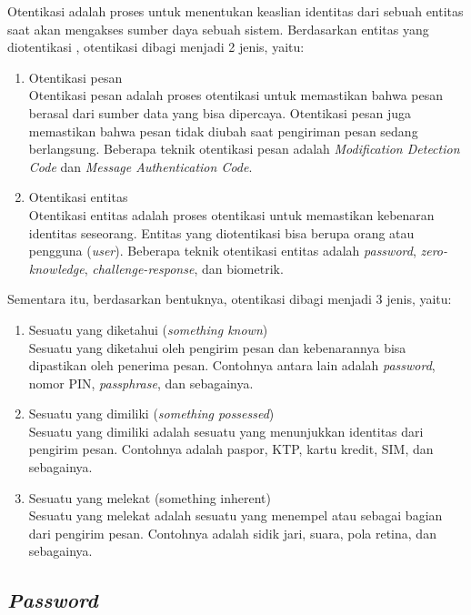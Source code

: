 Otentikasi adalah proses untuk menentukan keaslian identitas dari sebuah entitas saat akan mengakses sumber daya sebuah sistem. Berdasarkan entitas yang diotentikasi \cite{forouzan2007cryptography}, otentikasi dibagi menjadi 2 jenis, yaitu:

\begin{enumerate}
	\item Otentikasi pesan \\
	Otentikasi pesan adalah proses otentikasi untuk memastikan bahwa pesan berasal dari sumber data yang bisa dipercaya. Otentikasi pesan juga memastikan bahwa pesan tidak diubah saat pengiriman pesan sedang berlangsung. Beberapa teknik otentikasi pesan adalah \textit{Modification Detection Code} dan \textit{Message Authentication Code}.
	\item Otentikasi entitas \\
	Otentikasi entitas adalah proses otentikasi untuk memastikan kebenaran identitas seseorang. Entitas yang diotentikasi bisa berupa orang atau pengguna (\textit{user}). Beberapa teknik otentikasi entitas adalah \textit{password}, \textit{zero-knowledge}, \textit{challenge-response}, dan biometrik.
\end{enumerate}

Sementara itu, berdasarkan bentuknya\cite{forouzan2007cryptography}, otentikasi dibagi menjadi 3 jenis, yaitu:
\begin{enumerate}
	\item Sesuatu yang diketahui (\textit{something known}) \\
	Sesuatu yang diketahui oleh pengirim pesan dan kebenarannya bisa dipastikan oleh penerima pesan. Contohnya antara lain adalah \textit{password}, nomor PIN, \textit{passphrase}, dan sebagainya.
	\item Sesuatu yang dimiliki (\textit{something possessed}) \\
	Sesuatu yang dimiliki adalah sesuatu yang menunjukkan identitas dari pengirim pesan. Contohnya adalah paspor, KTP, kartu kredit, SIM, dan sebagainya.
	\item Sesuatu yang melekat (something inherent) \\
	Sesuatu yang melekat adalah sesuatu yang menempel atau sebagai bagian dari pengirim pesan. Contohnya adalah sidik jari, suara, pola retina, dan sebagainya.
\end{enumerate}

\subsection{\textit{Password}}

